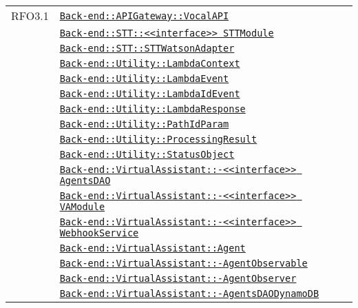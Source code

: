 \begin{longtable}{|>{\centering}m{3cm}|m{10cm}<{\centering}|}
RFO3.1 & \hyperref[Back-end::APIGateway::VocalAPI]{\texttt{Back-end::APIGateway::VocalAPI}}\\
& \hyperref[Back-end::STT::<<interface>> STTModule]{\texttt{Back-end::STT::<<interface>> STTModule}}\\
& \hyperref[Back-end::STT::STTWatsonAdapter]{\texttt{Back-end::STT::STTWatsonAdapter}}\\
& \hyperref[Back-end::Utility::LambdaContext]{\texttt{Back-end::Utility::LambdaContext}}\\
& \hyperref[Back-end::Utility::LambdaEvent]{\texttt{Back-end::Utility::LambdaEvent}}\\
& \hyperref[Back-end::Utility::LambdaIdEvent]{\texttt{Back-end::Utility::LambdaIdEvent}}\\
& \hyperref[Back-end::Utility::LambdaResponse]{\texttt{Back-end::Utility::LambdaResponse}}\\
& \hyperref[Back-end::Utility::PathIdParam]{\texttt{Back-end::Utility::PathIdParam}}\\
& \hyperref[Back-end::Utility::ProcessingResult]{\texttt{Back-end::Utility::ProcessingResult}}\\
& \hyperref[Back-end::Utility::StatusObject]{\texttt{Back-end::Utility::StatusObject}}\\
& \hyperref[Back-end::VirtualAssistant::<<interface>> AgentsDAO]{\texttt{Back-end::VirtualAssistant::-\linebreak <<interface>> AgentsDAO}}\\
& \hyperref[Back-end::VirtualAssistant::<<interface>> VAModule]{\texttt{Back-end::VirtualAssistant::-\linebreak <<interface>> VAModule}}\\
& \hyperref[Back-end::VirtualAssistant::<<interface>> WebhookService]{\texttt{Back-end::VirtualAssistant::-\linebreak <<interface>> WebhookService}}\\
& \hyperref[Back-end::VirtualAssistant::Agent]{\texttt{Back-end::VirtualAssistant::Agent}}\\
& \hyperref[Back-end::VirtualAssistant::AgentObservable]{\texttt{Back-end::VirtualAssistant::-\linebreak AgentObservable}}\\
& \hyperref[Back-end::VirtualAssistant::AgentObserver]{\texttt{Back-end::VirtualAssistant::-\linebreak AgentObserver}}\\
& \hyperref[Back-end::VirtualAssistant::AgentsDAODynamoDB]{\texttt{Back-end::VirtualAssistant::-\linebreak AgentsDAODynamoDB}}\\

\end{longtable}
